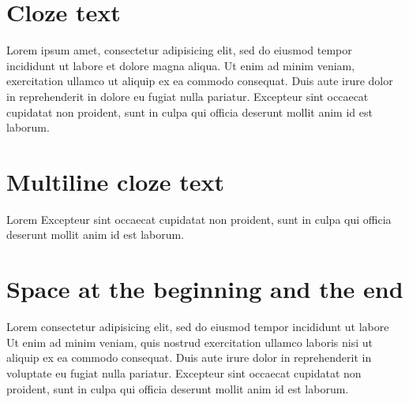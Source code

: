\documentclass{article}
\begin{document}
\section{Cloze text}

Lorem ipsum  amet, consectetur adipisicing elit, sed do
eiusmod tempor incididunt ut labore et dolore magna aliqua. Ut enim ad
minim veniam,  exercitation ullamco  ut aliquip ex ea commodo consequat. Duis aute irure dolor in
reprehenderit in  dolore eu fugiat
nulla pariatur. Excepteur sint occaecat cupidatat non proident, sunt in
culpa qui officia deserunt mollit anim id est laborum.

\section{Multiline cloze text}

Lorem  Excepteur
sint occaecat cupidatat non proident, sunt in culpa qui officia deserunt
mollit anim id est laborum.

\section{Space at the beginning and the end}

Lorem  consectetur adipisicing elit, sed
do eiusmod tempor incididunt ut labore 
Ut enim ad minim veniam, quis nostrud exercitation ullamco laboris nisi
ut aliquip ex ea commodo consequat. Duis aute irure dolor in
reprehenderit in voluptate  eu fugiat
nulla pariatur. Excepteur sint occaecat cupidatat non proident, sunt in
culpa qui officia deserunt mollit anim id est laborum.
\end{document}
